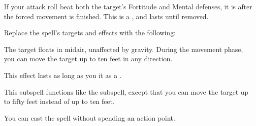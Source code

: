 
If your attack roll beat both the target's Fortitude and Mental defenses, it is \immobilized after the forced movement is finished.
This is a , and lasts until removed.









Replace the spell's targets and effects with the following:
\begin{spellcontent}

\begin{augmenttargetinginfo}




\end{augmenttargetinginfo}


\begin{augmenteffects}



\spelleffect
The target floats in midair, unaffected by gravity.
During the movement phase, you can move the target up to ten feet in any direction.

This effect lasts as long as you  it as a .






\end{augmenteffects}

\end{spellcontent}






This subspell functions like the  subspell, except that you can move the target up to fifty feet instead of up to ten feet.






You can cast the spell without spending an action point.




